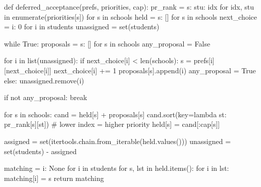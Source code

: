 def deferred_acceptance(prefs, priorities, cap):
    pr_rank = {s: {stu: idx for idx, stu in enumerate(priorities[s])} for s in schools}
    held = {s: [] for s in schools}
    next_choice = {i: 0 for i in students}
    unassigned = set(students)

    while True:
        proposals = {s: [] for s in schools}
        any_proposal = False

        for i in list(unassigned):
            if next_choice[i] < len(schools):
                s = prefs[i][next_choice[i]]
                next_choice[i] += 1
                proposals[s].append(i)
                any_proposal = True
            else:
                unassigned.remove(i)

        if not any_proposal:
            break

        for s in schools:
            cand = held[s] + proposals[s]
            cand.sort(key=lambda st: pr_rank[s][st])  # lower index = higher priority
            held[s] = cand[:cap[s]]

        assigned = set(itertools.chain.from_iterable(held.values()))
        unassigned = set(students) - assigned

    matching = {i: None for i in students}
    for s, lst in held.items():
        for i in lst:
            matching[i] = s
    return matching